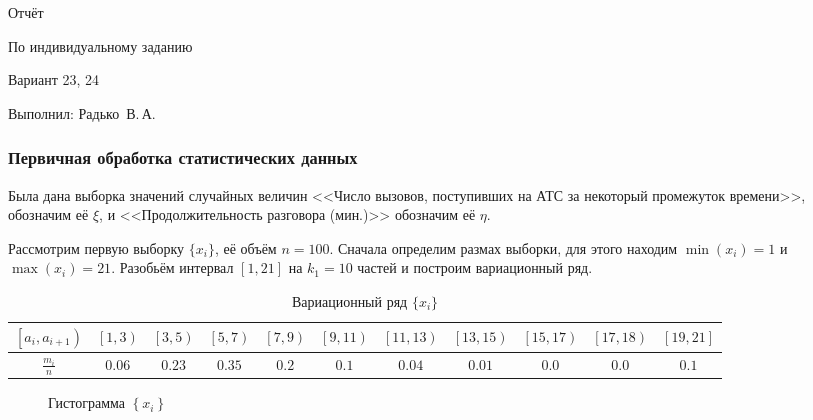 \documentclass{report}
\begin{document}
\begin{centering}
Отчёт

По индивидуальному заданию

Вариант 23, 24

Выполнил: Радько~В.\,А.\\
\end{centering}

\vspace{7mm}

\subsubsection*{Первичная обработка статистических данных}

Была дана выборка значений случайных величин <<Число вызовов, поступивших на АТС за некоторый промежуток времени>>, обозначим её $\xi$, и <<Продолжительность разговора (мин.)>> обозначим её $\eta$.

Рассмотрим первую выборку $\{ x_i \}$, её объём $n = 100$. 
Сначала определим размах выборки, для этого находим $\min(x_i) = 1$ и $\max(x_i) = 21$. 
Разобьём интервал $[1, 21]$ на $k_1 = 10$ частей и построим вариационный ряд.

\begin{table}[h]
\begin{tabularx}{\textwidth}{|c|c|c|c|c|c|c|c|c|c|c|}
\hline
    $\left [a_i, a_{i+1}\right)$ & $\left [1, 3\right )$ & $\left [3, 5\right )$ & $\left [5, 7\right )$ & $\left [7, 9\right )$ & $\left [9, 11\right )$ & $\left [11, 13\right )$ & $\left [13, 15\right )$ & $\left [15, 17\right )$ & $\left [17, 18\right )$ & $\left [19, 21\right ]$ \\
\hline
    $\frac{m_i}{n}$ & $0.06$ & $0.23$ & $0.35$ & $0.2$ & $0.1$ & $0.04$ & $0.01$ & $0.0$ & $0.0$ & $0.1$ \\
\hline
\end{tabularx}
\setcounter{table}{0}
\caption {Вариационный ряд $\{ x_i \}$}
\end{table}

\begin{figure}[h] \label{fig:1}
\centering
{}
\caption{Гистограмма $\left \{ x_i \right\}$}
\end{figure}
\end{document}
